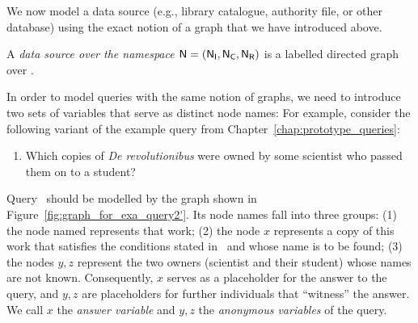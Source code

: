 We now model a data source (e.g., library catalogue, authority file, or other database)
using the exact notion of a graph that we have introduced above.
%
\begin{definition}
  A \emph{data source over the namespace $\textup{\textsf{N}}=(\mathsf{N}_\mathsf{I},\mathsf{N}_\mathsf{C},\mathsf{N}_\mathsf{R})$} is a labelled directed graph
  over \namespace.
\end{definition}
%
%
In order to model queries with the same notion of graphs, we need to introduce
two sets of variables that serve as distinct node names:
For example, consider the following variant of the example query  from Chapter~\ref{chap:prototype_queries}:
%
\begin{enumerate}
  \item[\exaquery{2$'$}]
    Which copies of \emph{De revolutionibus} were owned by some scientist who passed them on to a student?
\end{enumerate}
%
Query~
should be modelled by the graph shown in Figure~\ref{fig:graph_for_exa_query2'}.
Its node names fall into three groups:
(1) the node named  represents that work;
(2) the node $x$ represents a copy of this work that satisfies the conditions stated in~ and
whose name is to be found;
(3) the nodes $y,z$ represent the two owners (scientist and their student) whose names are not known.
Consequently, $x$ serves as a placeholder for the answer to the query,
and $y,z$ are placeholders for further individuals that \enquote{witness} the answer.
We call $x$ the \emph{answer variable} and $y,z$ the \emph{anonymous variables}
of the query.

